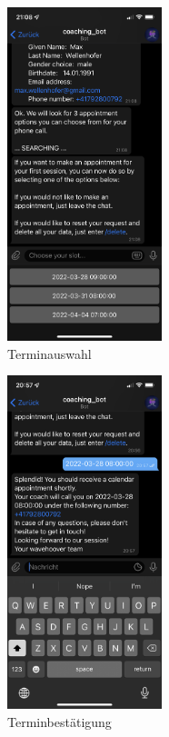 	\begin{figure}
		\centering
		\includegraphics[width=0.4\textwidth]{images/Screenshots/appointment-selection.PNG}
		\caption{Terminauswahl}
		\label{fig: scs..appointment-selection}
	\end{figure}


	\begin{figure}
		\centering
		\includegraphics[width=0.4\textwidth]{images/Screenshots/appointment-made.PNG}
		\caption{Terminbestätigung}
		\label{fig: scs..Abbildung 10}
	\end{figure}


